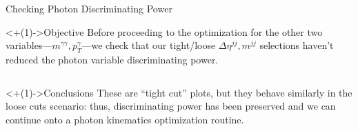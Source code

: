 \documentclass[]{beamer}
\begin{document}
\begin{frame}{Checking Photon Discriminating Power}
    \begin{block}<+(1)->{Objective}
        Before proceeding to the optimization for the other two variables---$m^{\gamma \gamma}, p_T^\gamma$---we check that our tight/loose $\Delta \eta^{jj}, m^{jj}$ selections haven't reduced the photon variable discriminating power.
    \end{block}
    
    \bigskip
    
    \begin{columns}
    \end{columns}
    \begin{block}<+(1)->{Conclusions}
        These are ``tight cut'' plots, but they behave similarly in the loose cuts scenario: thus, discriminating power has been preserved and we can continue onto a photon kinematics optimization routine.
    \end{block}
\end{frame}
\end{document}
